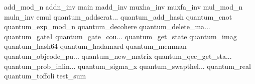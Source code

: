 add_mod_n
addn_inv
main
madd_inv
muxha_inv
muxfa_inv
mul_mod_n
muln_inv
emul
quantum_addscrat...
quantum_add_hash
quantum_cnot
quantum_exp_mod_n
quantum_decohere
quantum_delete_ma...
quantum_gate1
quantum_gate_cou...
quantum_get_state
quantum_imag
quantum_hash64
quantum_hadamard
quantum_memman
quantum_objcode_pu...
quantum_new_matrix
quantum_qec_get_sta...
quantum_prob_inlin...
quantum_sigma_x
quantum_swapthel...
quantum_real
quantum_toffoli
test_sum
